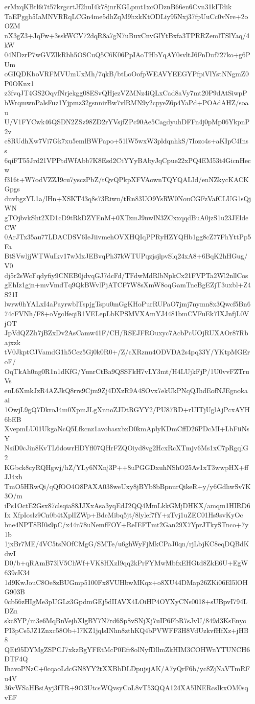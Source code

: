erMxqKBtl6i7t57krgcrtJf2huI4k78jnrKGLpmt1xcODznB66en6Cvn31kITdik
TaEPggh5IaMNVRRqLCGn4me5dhZqM9hxkKtODLiy95Nxj37fpUuCc0vNre+2oOZM
nX3gZ3+JqFw+3sskWCV72dqR8a7gN7uBuxCnvGlYtBxfa3TPRRZemlTSlYaq/4kW
04NDzrP7wGVZIkRbh5OSCuQ5C6K06PpIAoTHbYqAY0svltJ6FnDuf727ko+g6PUm
oGIQDKboVRFMVUmUxMh/7qkB/btLoOofpWEAVYEEGYPfpiVlYstNNgmZ0P0OKnx1
z3fvqJT4GS2OqvfNrjekgg08ESvQHjezVZMNz4iQLxCad8aVy7mt20P9dAtSiwpP
bWrqmwnPalsFuz1Yjpmz32gsnnirBw7vlRMN9y2cpyeZ6p4YaPd+POAdAHZ/soau
U/V1FYCwk46QSDN2ZSz98ZD2rYVsjfZPc90Ae5CagdyuhDFFn4j0pMp06YkpnP2v
c8RUdhXw7Vi7Gk7xu5emlBWPapo+51lW5wxW3pldqnhkS/7Iozo4s+aKIpC4Inss
6qiFT55Jrd21VPPtdWfAbb7K8Esd2CtYYyBAbyJqCpue22xPQ4EM53t4GicnHecw
f316t+W7odVZZJ9cu7ysczPbZ/tQvQPkpXFVAownTQYQALId/enNZkycKACKGpgs
duvbgzYL1a/lHn+XSKT43q8s73Riwu/tRn83UO9YsRW0NouCGFzVafCLUG1sQjWN
gTOjbvkSht2XD1cD9tRkDZYEnM+0XTzmJ9nwlN3ZCxxqqdBuA0jzS1u23JEldeCW
0ArJTx35au77LDACDSV6IeJiivmehOVXHQIqPPRyHZYQHb1gg8cZ77FhYttPp5Fa
BtSVwljjWTWuIkv17wMxJEBvqPh37kWTUPqzjsjlpvSlq24xA8+6BqK2hHGug/V0
dj5r2sWcFqdyfiy9CNEB0jdvqGJ7dcFd/TFdwMdRlbNpkCx21FVPTa2Wl2nllCos
gEhIz1gjn+mvVmdTq9QkBWvlPjATCF7W8sXmW8oqGamTncBgEZjT3uxbl+Z4S21I
lwrw0hYALxI4aPayrwbITspjgTspu0mGgKHoPurRUPaO7jmj7nymn8x3Qwcf5Bn6
74cFVNh/F8+oVgolfeqiR1VELepLbKPSMVXAmYJ4481bmCVFuEk7IXJnfjL0VjOT
JpVdQZZh7jBZxDv2AsCamw41F/CH/RSEJFROuxyc7AcbPcUOjRUXAOr87Rbajxzk
tV0JkptCJVamdG1h5Ccz5Gj0k0R0+/Z/cXRznu4ODVDA2s4pq33Y/YKtpMGEroF/
OqTkAh0ng0R1n1dKfG/YunrCtBa9QSSFkH7vLY3mt/H4LUjkFjP/1U0vvFZTruVs
euL6XmkJzR4AZJkQ8rrs9Cjm9Zj4DXzR9A4SOvx7ekUkPNqQJhdEofNJEgnokaai
1OwjL9gQ7DkroJ4m0XpmJLgXnnoZJDtRGYY2/PU87RD+rUITjUglAjPcxAYH6bEB
XvepmLU01UkgaNcQ5Lfkcnz1avobasxbxD0kmAplyKDmCffD26PDcMI+LbFiiNsY
NsiD0cJin8KvTL6dowrHDYfl07QHrFZQOiyd8vg2HcxRcXTmjv6Ms1xC7pRgqlG2
KGbck8cyRQHgwj/hZ/YLy6NXnj3P++8uPGGDxuhNShO25Av1xT3wwpHX+ffJJ4xh
TmO5HRwQi/qQfOO4O8PAXA038weUxy8jBYb8bBpnurQikeR+y/y6GdhwSv7K3O/m
iPs1OctE2Gsx87clsqia88JJXxAsa3yqEdJ2QQ4MmLkkGMjDHKX/amqm1HIRD6Ix
XfpIoslz9Cn0b4tXplIZWp+BdcMibq5jt/8lylef7fY+zTvj1uZEC01Hs9svKyOc
bne4NPT8BI0s9pC/x44n78uNemfFOY+ReIEFTmt2Gan29X7YprJTkySTnco+7y1b
1jxBr7ME/4VC5tsNOfCMgG/SMTe/u6ghWyFjMkCPaJ0qn/rjLbjKC8eqDQBdKdwI
D0/b+qRAmB73lV5ChWf+VK8HXzI9qq2kPrFYMwMbfxEHGtd8ZkE6U+EgW639cK34
1d9KwJouC8Oe8zBUGmp5100Fx8VUHbwMKqx+o8XU44DMap26ZKi06El5lOHG903B
0cb56zHIgMe3pUGLz3GpdmGEj5dIIAVX4LOiHP4OYXyCNs0018+sUBpvI794LDZn
skc8YP/m3e6MqBnVejhXlgBY7N7rd6Sp8vSNjXj7uIP6FbR7sJvU/849d3KsEnyo
PI3pCs5JZ1Znxc58Ob+I7KZ1jqlsINhn8zthKQ4bPVWFF3H8VdUzkvfHfXz+jHB8
QEt95DYMgZSPCJ7xkzBgYFEtMcP0Efr8olNyfDllmZkHIM3COHWnYTUNCH6DTF4Q
IhavoPNzC+0cqaoLdcGN8YY2tXXBhDLDpujsjAK/A7yQrF6b/yc8ZjNaVTmRFu4V
36vWSaHBsiAyj3fTR+9O3UtcsWQvsyCoL8vT53QQA124XA5INERcsIkxOM0sqvEF
